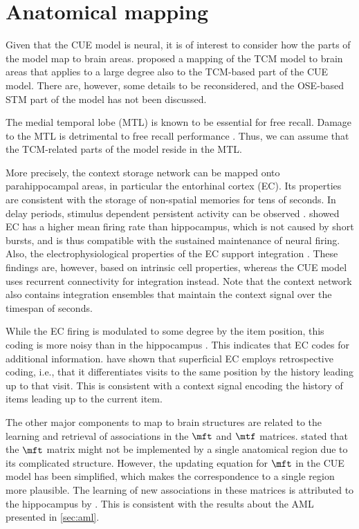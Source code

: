 \section{Anatomical mapping}

Given that the CUE model is neural, it is of interest to consider how the parts of the model map to brain areas.
\Textcite{howard2005} proposed a mapping of the TCM model to brain areas that applies to a large degree also to the TCM-based part of the CUE model.
There are, however, some details to be reconsidered, and the OSE-based STM part of the model has not been discussed.

The medial temporal lobe (MTL) is known to be essential for free recall.
Damage to the MTL is detrimental to free recall performance \parencite{graf1984}.
Thus, we can assume that the TCM-related parts of the model reside in the MTL\@.

More precisely, the context storage network can be mapped  onto parahippocampal areas, in particular the entorhinal cortex (EC).
Its properties are consistent with the storage of non-spatial memories for tens of seconds.
In delay periods, stimulus dependent persistent activity can be observed \parencite{suzuki1997,young1997}.
\Textcite{quirk1992} showed EC has a higher mean firing rate than hippocampus, which is not caused by short bursts, and is thus compatible with the sustained maintenance of neural firing.
Also, the electrophysiological properties of the EC support integration \parencite{egorov2002}.
These findings are, however, based on intrinsic cell properties, whereas the CUE model uses recurrent connectivity for integration instead.
Note that the context network also contains integration ensembles that maintain the context signal over the timespan of seconds.

While the EC firing is modulated to some degree by the item position, this coding is more noisy than in the hippocampus \parencite{quirk1992}.
This indicates that EC codes for additional information.
\Textcite{frank2000} have shown that superficial EC employs retrospective coding, i.e., that it differentiates visits to the same position by the history leading up to that visit.
This is consistent with a context signal encoding the history of items leading up to the current item.

The other major components to map to brain structures are related to the learning and retrieval of associations in the $\mft$ and $\mtf$ matrices.
\Textcite{howard2005} stated that the $\mft$ matrix might not be implemented by a single anatomical region due to its complicated structure.
However, the updating equation for $\mft$ in the CUE model has been simplified, which makes the correspondence to a single region more plausible.
The learning of new associations in these matrices is attributed to the hippocampus by \textcite{howard2005}.
This is consistent with the results about the AML presented in \cref{sec:aml}.

